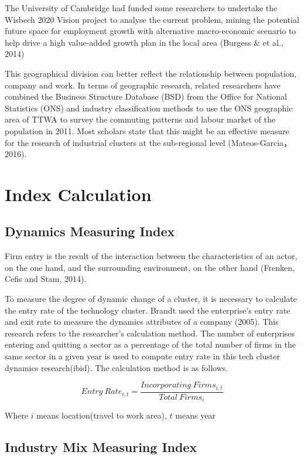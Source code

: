 \documentclass[
  12pt,
  oneside]{book}
\begin{document}
The University of Cambridge had funded some researchers to undertake the Wisbech 2020 Vision project to analyse the current problem, mining the potential future space for employment growth with alternative macro-economic scenario to help drive a high value-added growth plan in the local area (Burgess \& et al., 2014)

This geographical division can better reflect the relationship between population, company and work. In terms of geographic research, related researchers have combined the Business Structure Database (BSD) from the Office for National Statistics (ONS) and industry classification methods to use the ONS geographic area of TTWA to survey the commuting patterns and labour market of the population in 2011. Most scholars state that this might be an effective measure for the research of industrial clusters at the sub-regional level (Mateos-Garcia，2016).

\hypertarget{index-calculation}{%
\section{Index Calculation}\label{index-calculation}}

\hypertarget{dynamics-measuring-index}{%
\subsection{Dynamics Measuring Index}\label{dynamics-measuring-index}}

Firm entry is the result of the interaction between the
characteristics of an actor, on the one hand, and the surrounding environment, on the other hand (Frenken, Cefis and Stam, 2014).

To measure the degree of dynamic change of a cluster, it is necessary to calculate the entry rate of the technology cluster. Brandt used the enterprise's entry rate and exit rate to measure the dynamics attributes of a company (2005). This research refers to the researcher's calculation method. The number of enterprises entering and quitting a sector as a percentage of the total number of firms in the same sector in a given year is used to compute entry rate in this tech cluster dynamics research(ibid). The calculation method is as follows.

\[ Entry\ Rate_{i,t} = \frac{Incorporating\ Firms_{i,t}}{Total\  Firms_{i}} \]

Where \(i\) means location(travel to work area), \(t\) means year

\hypertarget{industry-mix-measuring-index}{%
\subsection{Industry Mix Measuring Index}\label{industry-mix-measuring-index}}
\end{document}
